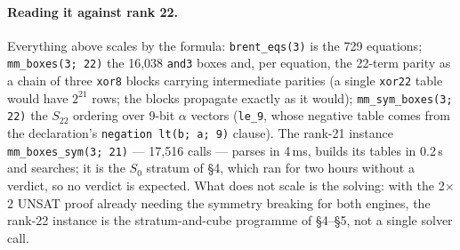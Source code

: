 \documentclass[10pt]{article}
\begin{document}
\paragraph{Reading it against rank 22.}
Everything above scales by the formula: \texttt{brent\_eqs(3)} is the 729
equations; \texttt{mm\_boxes(3; 22)} the 16{,}038 \texttt{and3} boxes and,
per equation, the 22-term parity as a chain of three \texttt{xor8} blocks
carrying intermediate parities (a single \texttt{xor22} table would have
$2^{21}$ rows; the blocks propagate exactly as it would);
\texttt{mm\_sym\_boxes(3; 22)} the $S_{22}$ ordering over 9-bit $\alpha$
vectors (\texttt{le\_9}, whose negative table comes from the declaration's
\texttt{negation lt(b; a; 9)} clause). The rank-21 instance
\texttt{mm\_boxes\_sym(3; 21)} --- 17{,}516 calls --- parses in 4\,ms,
builds its tables in 0.2\,s and searches; it is the $S_0$ stratum of \S4,
which ran for two hours without a verdict, so no verdict is expected. What
does not scale is the solving: with the 2$\times$2 UNSAT proof already
needing the symmetry breaking for both engines, the rank-22 instance is the
stratum-and-cube programme of \S4--\S5, not a single solver call.
\end{document}
